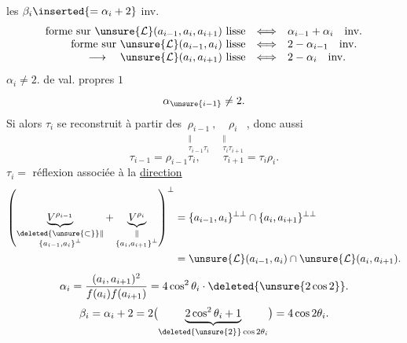  les $\beta_i\inserted{=\alpha_i+2}$ inv.
\[
\begin{array}{rcl}
\text{forme sur }\unsure{\mathcal L}(a_{i-1},a_i,a_{i+1})\text{ lisse}
&\Longleftrightarrow&\alpha_{i-1}+\alpha_i\quad\text{inv.}\\
\text{forme sur }\unsure{\mathcal L}(a_{i-1},a_i)\text{ lisse}
&\Longleftrightarrow&2-\alpha_{i-1}\quad\text{inv.}\\
\longrightarrow\quad\unsure{\mathcal L}(a_i,a_{i+1})\text{ lisse}
&\Longleftrightarrow&2-\alpha_i\quad\text{inv.}
\end{array}
\]
$\alpha_i\ne2$.  de val. propres $1$
\[
\alpha_{\unsure{i-1}}\ne2.
\]
 Si
alors $\tau_i$ se reconstruit à partir des
$\underset{\substack{\Vert\\\tau_{i-1}\tau_i}}{\rho_{i-1}},\
\underset{\substack{\Vert\\\tau_i\tau_{i+1}}}{\rho_i}$,
donc aussi
\[
\tau_{i-1}=\rho_{i-1}\tau_i,\qquad
\tau_{i+1}=\tau_i\rho_i.
\]
$\tau_i=$ \deleted{\unsure{sym.}} réflexion associée à la \uline{direction}
\[
\begin{aligned}
\left(
\underbrace{V^{\rho_{i-1}}}_{\substack{\deleted{\unsure{\subset}}\Vert\\\{a_{i-1},a_i\}^{\perp}}}
+
\underbrace{V^{\rho_i}}_{\substack{\Vert\\\{a_i,a_{i+1}\}^{\perp}}}
\right)^\perp
&=\{a_{i-1},a_i\}^{\perp\perp}\cap\{a_i,a_{i+1}\}^{\perp\perp}\\
&=\unsure{\mathcal L}(a_{i-1},a_i)\cap\unsure{\mathcal L}(a_i,a_{i+1}).
\end{aligned}
\]
\[
\alpha_i=\frac{(a_i,a_{i+1})^2}{f(a_i)f(a_{i+1})}
=4\cos^2\theta_i\cdot\deleted{\unsure{2\cos2}}.
\]
\[
\beta_i=\alpha_i+2
=2\bigl(\underbrace{2\cos^2\theta_i+1}_{\deleted{\unsure{2}}\cos2\theta_i}\bigr)
=4\cos2\theta_i.
\]

